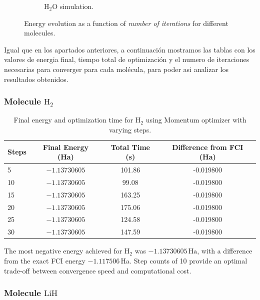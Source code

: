 \begin{figure}[H]
\begin{subfigure}{0.45\textwidth}
    \caption{H$_2$O simulation.}
    \label{fig:num_iterations_h2o}
  \end{subfigure}
  \caption{Energy evolution as a function of \textit{number of iterations} for different molecules.}
  \label{fig:num_iterations_results}
\end{figure}

Igual que en los apartados anteriores, a continuación mostramos las tablas con los valores de energia final, tiempo total de optimización y el numero de iteraciones necesarias para converger para cada molécula, para poder asi analizar los resultados obtenidos.

\subsubsection{Molecule \(\mathrm{H_2}\)}

\begin{table}[H]
\centering
\caption{Final energy and optimization time for \(\mathrm{H_2}\) using Momentum optimizer with varying steps.}
\begin{tabular}{lccc}
\toprule
\textbf{Steps} & \textbf{Final Energy (Ha)} & \textbf{Total Time (s)} & \textbf{Difference from FCI (Ha)} \\
\midrule
5 & \(\mathbf{-1.13730605}\) & 101.86 & -0.019800 \\ 
10 & \(\mathbf{-1.13730605}\) & \(\mathbf{99.08}\) & -0.019800 \\ 
15 & \(\mathbf{-1.13730605}\) & 163.25 & -0.019800 \\ 
20 & \(\mathbf{-1.13730605}\) & 175.06 & -0.019800 \\ 
25 & \(\mathbf{-1.13730605}\) & 124.58 & -0.019800 \\ 
30 & \(\mathbf{-1.13730605}\) & 147.59 & -0.019800 \\
\bottomrule
\end{tabular}
\end{table}

The most negative energy achieved for \(\mathrm{H_2}\) was \(-1.13730605\,\mathrm{Ha}\), with a difference from the exact FCI energy \(-1.117506\,\mathrm{Ha}\). Step counts of 10 provide an optimal trade-off between convergence speed and computational cost.

\subsubsection{Molecule \(\mathrm{LiH}\)}

